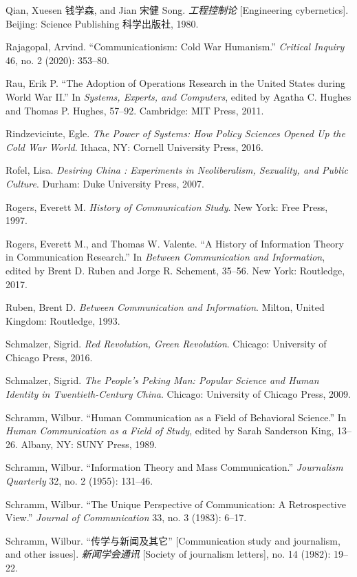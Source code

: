 \documentclass{tufte-handout}
\begin{document}
\begin{CJK*}{UTF8}{gbsn}
\begin{hangparas}{.25in}{1}
\begin{CJK*}{UTF8}{gbsn}
Qian, Xuesen 钱学森, and Jian 宋健 Song. \emph{工程控制论}
{[}Engineering cybernetics{]}. Beijing: Science Publishing 科学出版社,
1980.

Rajagopal, Arvind. ``Communicationism: Cold War Humanism.''
\emph{Critical Inquiry} 46, no. 2 (2020): 353--80.

Rau, Erik P. ``The Adoption of Operations Research in the United States
during World War II.'' In \emph{Systems, Experts, and Computers}, edited
by Agatha C. Hughes and Thomas P. Hughes, 57--92. Cambridge: MIT Press,
2011.

Rindzeviciute, Egle. \emph{The Power of Systems: How Policy Sciences
Opened Up the Cold War World}. Ithaca, NY: Cornell University Press,
2016.

Rofel, Lisa. \emph{Desiring China : Experiments in Neoliberalism,
Sexuality, and Public Culture}. Durham: Duke University Press, 2007.

Rogers, Everett M. \emph{History of Communication Study}. New York: Free
Press, 1997.

Rogers, Everett M., and Thomas W. Valente. ``A History of Information
Theory in Communication Research.'' In \emph{Between Communication and
Information}, edited by Brent D. Ruben and Jorge R. Schement, 35--56.
New York: Routledge, 2017.

Ruben, Brent D. \emph{Between Communication and Information}. Milton,
United Kingdom: Routledge, 1993.

Schmalzer, Sigrid. \emph{Red Revolution, Green Revolution}. Chicago:
University of Chicago Press, 2016.

Schmalzer, Sigrid. \emph{The People's Peking Man: Popular Science and
Human Identity in Twentieth-Century China}. Chicago: University of
Chicago Press, 2009.

Schramm, Wilbur. ``Human Communication as a Field of Behavioral
Science.'' In \emph{Human Communication as a Field of Study}, edited by
Sarah Sanderson King, 13--26. Albany, NY: SUNY Press, 1989.

Schramm, Wilbur. ``Information Theory and Mass Communication.''
\emph{Journalism Quarterly} 32, no. 2 (1955): 131--46.

Schramm, Wilbur. ``The Unique Perspective of Communication: A
Retrospective View.'' \emph{Journal of Communication} 33, no. 3 (1983):
6--17.

Schramm, Wilbur. ``传学与新闻及其它'' {[}Communication study and
journalism, and other issues{]}. \emph{新闻学会通讯} {[}Society of
journalism letters{]}, no. 14 (1982): 19--22.


\end{CJK*}
\end{hangparas}
\end{CJK*}
\end{document}
